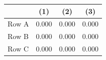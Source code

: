 %
\begin{tabular}{l*{3}{c}}
\doublerule
                &      (1)&      (2)&      (3)\\
\midrule
Row A           &    0.000&    0.000&    0.000\\
Row B           &    0.000&    0.000&    0.000\\
Row C           &    0.000&    0.000&    0.000\\
\midrule
\end{tabular}
